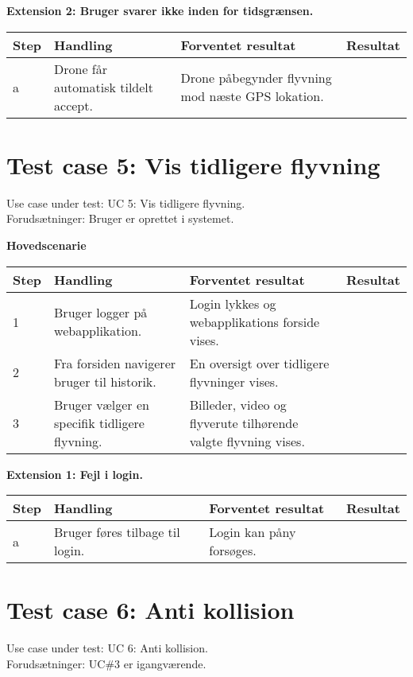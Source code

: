 \textbf{Extension 2: Bruger svarer ikke inden for tidsgrænsen.}
\begin{table}[H]
	\centering
		\begin{tabular}{|l|p{5 cm}|p{5 cm}|p{3.5 cm}|} 
		\hline
			Step & Handling & Forventet resultat & Resultat\\ \hline
			a & Drone får automatisk tildelt accept. & Drone påbegynder flyvning mod næste GPS lokation. & \\ \hline
		\end{tabular}
\end{table}

\newpage
\section{Test case 5: Vis tidligere flyvning}
Use case under test: UC 5: Vis tidligere flyvning.\\
Forudsætninger:	Bruger er oprettet i systemet.

\textbf{Hovedscenarie}
\begin{table}[H]
	\centering
		\begin{tabular}{|l|p{5 cm}|p{5 cm}|p{3.5 cm}|} 
		\hline
			Step & Handling & Forventet resultat & Resultat\\ \hline
			1 & Bruger logger på webapplikation. & Login lykkes og webapplikations forside vises. &  \\ \hline
			2 & Fra forsiden navigerer bruger til historik. & En oversigt over tidligere flyvninger vises. & \\ \hline
			3 & Bruger vælger en specifik tidligere flyvning. &  Billeder, video og flyverute tilhørende valgte flyvning vises. & \\ \hline			
		\end{tabular}
\end{table}

\textbf{Extension 1: Fejl i login.}
\begin{table}[H]
	\centering
		\begin{tabular}{|l|p{5 cm}|p{5 cm}|p{3.5 cm}|} 
		\hline
			Step & Handling & Forventet resultat & Resultat\\ \hline
			a & Bruger føres tilbage til login. & Login kan påny forsøges. & \\ \hline
		\end{tabular}
\end{table}

\section{Test case 6: Anti kollision}
Use case under test: UC 6: Anti kollision.\\
Forudsætninger:	UC\#3 er igangværende.

